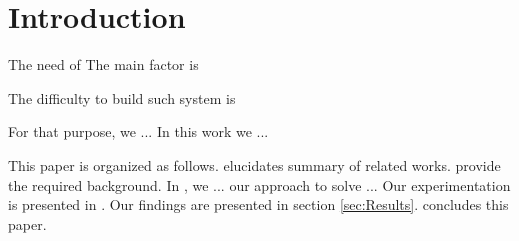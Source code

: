 \section{Introduction} \label{sec:Introduction}

The need of
The main factor is

The difficulty to build such system is 





For that purpose,
	we ...
In this work we ...

This paper is organized as follows.
 elucidates summary of related works.
 provide the required background.
In ,
	we ... our approach to solve ...
Our experimentation is presented in .
Our findings are presented in section \ref{sec:Results}.
 concludes this paper.



